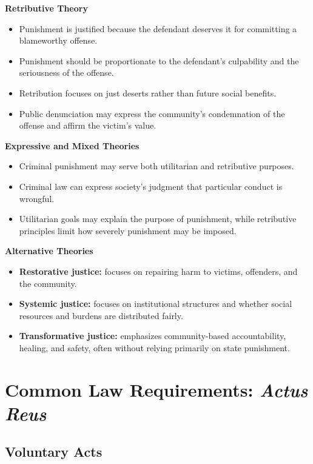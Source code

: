 \documentclass[11pt]{tex/lawoutline}
\begin{document}
\textbf{Retributive Theory}
\begin{itemize}
    \item Punishment is justified because the defendant deserves it for committing a blameworthy offense.
    \item Punishment should be proportionate to the defendant's culpability and the seriousness of the offense.
    \item Retribution focuses on just deserts rather than future social benefits.
    \item Public denunciation may express the community's condemnation of the offense and affirm the victim's value.
\end{itemize}


\textbf{Expressive and Mixed Theories}
\begin{itemize}
    \item Criminal punishment may serve both utilitarian and retributive purposes.
    \item Criminal law can express society's judgment that particular conduct is wrongful.
    \item Utilitarian goals may explain the purpose of punishment, while retributive principles limit how severely punishment may be imposed.
\end{itemize}


\textbf{Alternative Theories}
\begin{itemize}
    \item \textbf{Restorative justice:} focuses on repairing harm to victims, offenders, and the community.
    \item \textbf{Systemic justice:} focuses on institutional structures and whether social resources and burdens are distributed fairly.
    \item \textbf{Transformative justice:} emphasizes community-based accountability, healing, and safety, often without relying primarily on state punishment.
\end{itemize}



\chapter{Common Law Requirements: \textit{Actus Reus}}

\section{Voluntary Acts}
\end{document}
